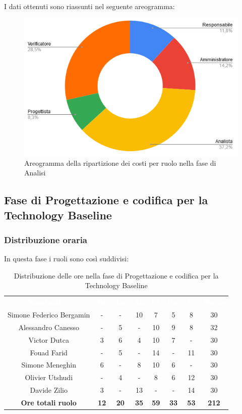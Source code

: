I dati ottenuti sono riassunti nel seguente areogramma:
\begin{figure}[H]
\centering
\includegraphics[scale=0.60]{img/grafici/torta_fase_analisi_prospetto_economico.png}
\caption{Areogramma della ripartizione dei costi per ruolo nella fase di Analisi}
\end{figure}
 
 
\subsection{Fase di Progettazione e codifica per la Technology Baseline}
\subsubsection{Distribuzione oraria}
In questa fase i ruoli sono così suddivisi:
\begin{table}[H]
\centering\renewcommand{\arraystretch}{1.5}
\caption{Distribuzione delle ore nella fase di Progettazione e codifica per la Technology Baseline}
\vspace{0.2cm}
\begin{tabular}{ c c c c c c c c }
\rowcolor{redafk}
\textcolor{white}{\textbf{Nominativo}} & \textcolor{white}{\textbf{Re}} &
\textcolor{white}{\textbf{Am}} & \textcolor{white}{\textbf{An}} &
\textcolor{white}{\textbf{Pt}} & \textcolor{white}{\textbf{Pm}} &
\textcolor{white}{\textbf{Ve}} & \textcolor{white}{\textbf{Totale}} \\
Simone Federico Bergamin & - & - & 10 & 7 & 5 & 8 & 30 \\
Alessandro Canesso & - & 5 & - & 10 & 9 & 8 & 32 \\
Victor Dutca & 3 & 6 & 4 & 10 & 7 & - & 30 \\
Fouad Farid & - & 5 & - & 14 & - & 11 & 30 \\
Simone Meneghin & 6 & - & 8 & 10 & 6 & - & 30 \\
Olivier Utshudi & - & 4 & - & 8 & 6 & 12 & 30 \\
Davide Zilio & 3 & - & 13 & - & - & 14 & 30 \\
\rowcolor{lastrowcolor}
\textbf{Ore totali ruolo} & \textbf{12} & \textbf{20} & \textbf{35} & \textbf{59} & \textbf{33} & \textbf{53} & \textbf{212} \\
\end{tabular}
\end{table}
 
